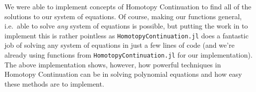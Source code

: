 \documentclass[11pt]{article}
\begin{document}
We were able to implement concepts of Homotopy Continuation to find all
of the solutions to our system of equations. Of course, making our
functions general, i.e.~able to solve \emph{any} system of equations is
possible, but putting the work in to implement this is rather pointless
as \texttt{HomotopyContinuation.jl} does a fantastic job of solving any
system of equations in just a few lines of code (and we're already using
functions from \texttt{HomotopyContinuation.jl} for our implementation).
The above implementation shows, however, how powerful techniques in
Homotopy Continuation can be in solving polynomial equations and how
easy these methods are to implement.


    
    
    
\end{document}
